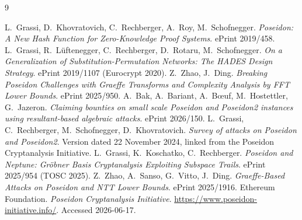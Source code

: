 \documentclass[11pt]{article}
\theoremstyle{plain}
\begin{document}
\begin{thebibliography}{9}
\raggedright
{} L.~Grassi, D.~Khovratovich, C.~Rechberger, A.~Roy, M.~Schofnegger.
  \emph{Poseidon: A New Hash Function for Zero-Knowledge Proof Systems}. ePrint
  2019/458.
 L.~Grassi, R.~L\"uftenegger, C.~Rechberger, D.~Rotaru,
  M.~Schofnegger. \emph{On a Generalization of Substitution-Permutation Networks:
  The HADES Design Strategy}. ePrint 2019/1107 (Eurocrypt 2020).
 Z.~Zhao, J.~Ding. \emph{Breaking Poseidon Challenges with Graeffe
  Transforms and Complexity Analysis by FFT Lower Bounds}. ePrint 2025/950.
 A.~Bak, A.~Bariant, A.~B{\oe}uf, M.~Hostettler, G.~Jazeron.
  \emph{Claiming bounties on small scale Poseidon and Poseidon2 instances using
  resultant-based algebraic attacks}. ePrint 2026/150.
 L.~Grassi, C.~Rechberger, M.~Schofnegger, D.~Khovratovich.
  \emph{Survey of attacks on Poseidon and Poseidon2}. Version dated 22 November
  2024, linked from the Poseidon Cryptanalysis Initiative.
 L.~Grassi, K.~Koschatko, C.~Rechberger.
  \emph{Poseidon and Neptune: Gr\"obner Basis Cryptanalysis Exploiting Subspace
  Trails}. ePrint 2025/954 (TOSC 2025).
 Z.~Zhao, A.~Sanso, G.~Vitto, J.~Ding.
  \emph{Graeffe-Based Attacks on Poseidon and NTT Lower Bounds}. ePrint 2025/1916.
 Ethereum Foundation. \emph{Poseidon Cryptanalysis Initiative}.
  \url{https://www.poseidon-initiative.info/}. Accessed 2026-06-17.
\end{thebibliography}
\end{document}
